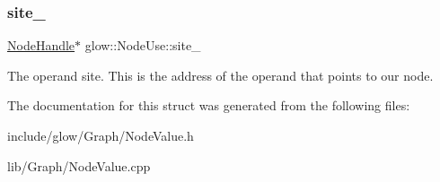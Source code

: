 \subsubsection{\texorpdfstring{site\+\_\+}{site\_}}
{\footnotesize\ttfamily \hyperlink{structglow_1_1_node_handle}{Node\+Handle}$\ast$ glow\+::\+Node\+Use\+::site\+\_\+}

The operand site. This is the address of the operand that points to our node. 

The documentation for this struct was generated from the following files\+:\begin{DoxyCompactItemize}
\item 
include/glow/\+Graph/Node\+Value.\+h\item 
lib/\+Graph/Node\+Value.\+cpp\end{DoxyCompactItemize}
